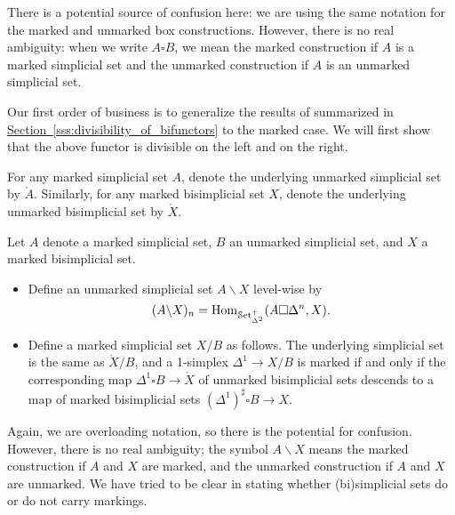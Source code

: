 \documentclass[main.tex]{subfiles}
\begin{document}
There is a potential source of confusion here: we are using the same notation for the marked and unmarked box constructions. However, there is no real ambiguity: when we write $A \square B$, we mean the marked construction if $A$ is a marked simplicial set and the unmarked construction if $A$ is an unmarked simplicial set.

Our first order of business is to generalize the results of \cite{qcats_vs_segal_spaces} summarized in \hyperref[sss:divisibility_of_bifunctors]{Section~\ref*{sss:divisibility_of_bifunctors}} to the marked case. We will first show that the above functor is divisible on the left and on the right.

\begin{notation}
  For any marked simplicial set $A$, denote the underlying unmarked simplicial set by $\mathring{A}$. Similarly, for any marked bisimplicial set $X$, denote the underlying unmarked bisimplicial set by $\mathring{X}$.
\end{notation}

\begin{definition}
  Let $A$ denote a marked simplicial set, $B$ an unmarked simplicial set, and $X$ a marked bisimplicial set.
  \begin{itemize}
    \item Define an unmarked simplicial set $A \backslash X$ level-wise by
      \begin{equation*}
        (A \backslash X)_{n} = \mathrm{Hom}_{\mathcal{S}\mathrm{et}_{\Delta^{2}}^{+}}(A \square \Delta^{n}, X).
      \end{equation*}

    \item Define a marked simplicial set $X / B$ as follows. The underlying simplicial set is the same as $\mathring{X} / B$, and a 1-simplex $\Delta^{1} \to X / B$ is marked if and only if the corresponding map $\Delta^{1} \square B \to \mathring{X}$ of unmarked bisimplicial sets descends to a map of marked bisimplicial sets $(\Delta^{1})^{\sharp} \square B \to X$.
  \end{itemize}
\end{definition}

Again, we are overloading notation, so there is the potential for confusion. However, there is no real ambiguity; the symbol $A \backslash X$ means the marked construction if $A$ and $X$ are marked, and the unmarked construction if $A$ and $X$ are unmarked. We have tried to be clear in stating whether (bi)simplicial sets do or do not carry markings.
\end{document}
